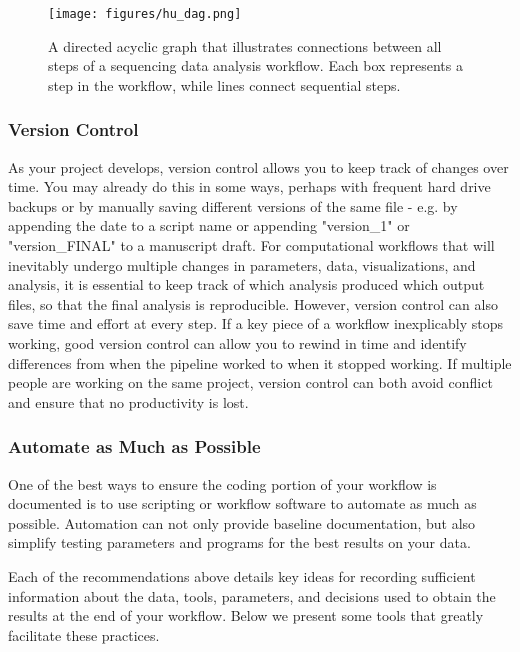 \documentclass[10pt,letterpaper]{article}
\begin{document}
\begin{figure}
\texttt{[image: figures/hu\_dag.png]}
\caption{A directed acyclic graph that illustrates connections between all steps of a sequencing data analysis workflow. Each box represents a step in the workflow, while lines connect sequential steps.}
\label{fig:sgc_workflow}
\end{figure}


\subsubsection*{Version Control} 
As your project develops, version control allows you to keep track of changes over time. 
You may already do this in some ways, perhaps with frequent hard drive backups or by manually saving different versions of the same file  - e.g. by appending the date to a script name or appending "version\_1" or "version\_FINAL" to a manuscript draft. 
For computational workflows that will inevitably undergo multiple changes in parameters, data, visualizations, and analysis, it is essential to keep track of which analysis produced which output files, so that the final analysis is reproducible. 
However, version control can also save time and effort at every step. 
If a key piece of a workflow inexplicably stops working, good version control can allow you to rewind in time and identify differences from when the pipeline worked to when it stopped working. 
If multiple people are working on the same project, version control can both avoid conflict and ensure that no productivity is lost. 


 \subsubsection*{Automate as Much as Possible} 
One of the best ways to ensure the coding portion of your workflow is documented is to use scripting or workflow software to automate as much as possible. 
Automation can not only provide baseline documentation, but also simplify testing parameters and programs for the best results on your data. 

Each of the recommendations above details key ideas for recording sufficient information about the data, tools, parameters, and decisions used to obtain the results at the end of your workflow. 
Below we present some tools that greatly facilitate these practices.
 
\end{document}
